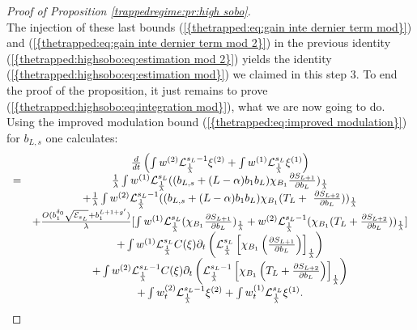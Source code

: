 \documentclass[11pt,a4paper,reqno]{amsart}
\theoremstyle{remark}
\numberwithin{equation}{section}
\begin{document}
\begin{proof}[Proof of Proposition \ref{trappedregime:pr:high sobo}]
\begin{equation}
\end{equation}
The injection of these last bounds {{\rm (\ref{{thetrapped:eq:gain inte dernier term mod}})}} and {{\rm (\ref{{thetrapped:eq:gain inte dernier term mod 2}})}} in the previous identity {{\rm (\ref{{thetrapped:highsobo:eq:estimation mod 2}})}} yields the identity {{\rm (\ref{{thetrapped:highsobo:eq:estimation mod}})}} we claimed in this step 3. To end the proof of the proposition, it just remains to prove {{\rm (\ref{{thetrapped:highsobo:eq:integration mod}})}}, what we are now going to do. Using the improved modulation bound {{\rm (\ref{{thetrapped:eq:improved modulation}})}} for $b_{L,s}$ one calculates:
\begin{equation} \label{thetrapped:highsobo:eq:expression radiation}
\begin{array}{r c l}
& \frac{d}{dt} \left( \int w^{(2)}\mathcal{L}_{\frac{1}{\lambda}}^{s_L-1} \xi^{(2)} + \int w^{(1)}\mathcal{L}_{\frac{1}{\lambda}}^{s_L} \xi^{(1)} \right) \\
=& \frac{1}{\lambda} \int w^{(1)}\mathcal{L}_{\frac{1}{\lambda}}^{s_L}((b_{L,s}+(L-\alpha)b_1b_L)\chi_{B_1} \frac{\partial S_{L+1}}{\partial b_L})_{\frac{1}{\lambda}} \\
&+ \frac{1}{\lambda} \int w^{(2)}\mathcal{L}_{\frac{1}{\lambda}}^{s_L-1}((b_{L,s}+(L-\alpha)b_1b_L)\chi_{B_1}(T_L+\ \frac{\partial S_{L+2}}{\partial b_L}))_{\frac{1}{\lambda}} \\
&+ \frac{O(b_1^{\delta_0}\sqrt{\mathcal{E}_{s_L}}+b_1^{L+1+g'})}{\lambda}  [ \int w^{(1)} \mathcal{L}_{\frac{1}{\lambda}}^{s_L}(\chi_{B_1}\frac{\partial S_{L+1}}{\partial b_L})_{\frac{1}{\lambda}} +w^{(2)}\mathcal{L}_{\frac{1}{\lambda}}^{s_L-1}(\chi_{B_1}(T_L+\frac{\partial S_{L+2}}{\partial b_L}))_{\frac{1}{\lambda}}  ]\\
&+  \int w^{(1)} \mathcal{L}_{\frac{1}{\lambda}}^{s_L} C(\xi) \partial_t \left( \mathcal{L}_{\frac{1}{\lambda}}^{s_L} \left[\chi_{B_1}\left(  \frac{\partial S_{L+1}}{\partial b_L}\right)\right]_{\frac{1}{\lambda}} \right)  \\
&+ \int w^{(2)} \mathcal{L}_{\frac{1}{\lambda}}^{s_L-1} C(\xi)  \partial_t \left( \mathcal{L}_{\frac{1}{\lambda}}^{s_L-1}  \left[\chi_{B_1}\left(T_L+ \frac{\partial S_{L+2}}{\partial b_L}\right)\right]_{\frac{1}{\lambda}} \right)\\
&+  \int w^{(2)}_t\mathcal{L}_{\frac{1}{\lambda}}^{s_L-1} \xi^{(2)} + \int w^{(1)}_t\mathcal{L}_{\frac{1}{\lambda}}^{s_L} \xi^{(1)}    .
\end{array}
\end{equation}

\end{proof}
\end{document}

